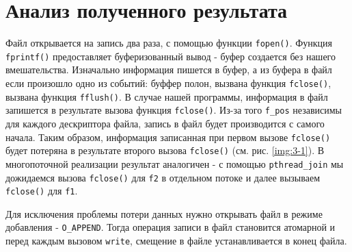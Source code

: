 

\section*{Анализ полученного результата}
Файл открывается на запись два раза, с помощью функции \texttt{fopen()}.
Функция \texttt{fprintf()} предоставляет буферизованный вывод - буфер создается без нашего вмешательства.
Изначально информация пишется в буфер, а из буфера в файл если произошло одно из событий: буффер полон, вызвана функция \texttt{fclose()}, вызвана функция \texttt{fflush()}.
В случае нашей программы, информация в файл запишется в результате вызова функция \texttt{fclose()}.
Из-за того \texttt{f\_pos} независимы для каждого дескриптора файла, запись в файл будет производится с самого начала.
Таким образом, информация записанная при первом вызове \texttt{fclose()} будет потеряна в результате второго вызова \texttt{fclose()} (см. рис. \ref{img:3-1}).
В многопоточной реализации результат аналогичен - с помощью \texttt{pthread\_join} мы дожидаемся вызова \texttt{fclose()} для \texttt{f2} в отдельном потоке и далее вызываем \texttt{fclose()} для \texttt{f1}.

Для исключения проблемы потери данных нужно открывать файл в режиме добавления - \texttt{O\_APPEND}. Тогда операция записи в файл становится атомарной и перед каждым вызовом \texttt{write}, смещение в файле устанавливается в конец файла.
